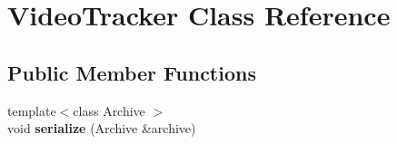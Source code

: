 \hypertarget{classVideoTracker}{}\section{Video\+Tracker Class Reference}
\label{classVideoTracker}
\subsection*{Public Member Functions}
\begin{DoxyCompactItemize}
\item 
\hypertarget{classVideoTracker_a829485245ee54ecc195c3069024e615b}{}{\footnotesize template$<$class Archive $>$ }\\void {\bfseries serialize} (Archive \&archive)\label{classVideoTracker_a829485245ee54ecc195c3069024e615b}


\end{DoxyCompactItemize}

